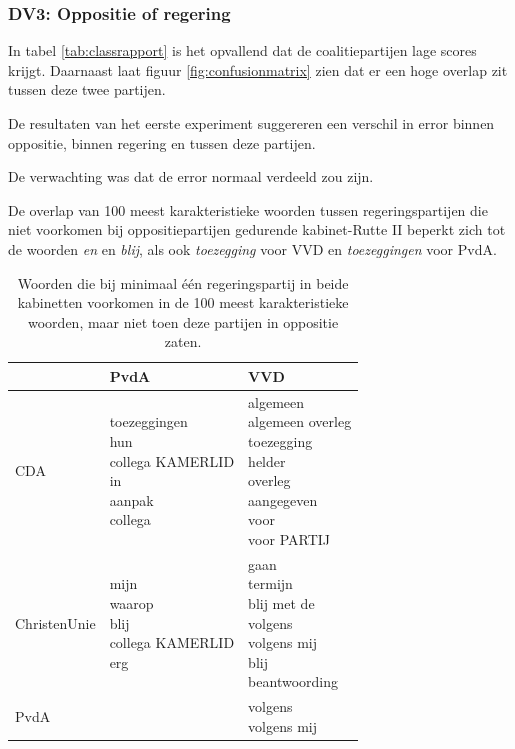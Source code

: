 \subsubsection{DV3: Oppositie of regering}
In tabel \ref{tab:classrapport} is het opvallend dat de coalitiepartijen lage scores krijgt. Daarnaast laat figuur \ref{fig:confusionmatrix} zien dat er een hoge overlap zit tussen deze twee partijen.\par
De resultaten van het eerste experiment suggereren een verschil in error binnen oppositie, binnen regering en tussen deze partijen.\par
De verwachting was dat de error normaal verdeeld zou zijn.\par
De overlap van 100 meest karakteristieke woorden tussen regeringspartijen die niet voorkomen bij oppositiepartijen gedurende kabinet-Rutte II beperkt zich tot de woorden \textit{en} en \textit{blij}, als ook \textit{toezegging} voor VVD en \textit{toezeggingen} voor PvdA.\par
\begin{table}[H]
\label{tab:overlapkabinetten}
\caption{Woorden die bij minimaal één regeringspartij in beide kabinetten voorkomen in de 100 meest karakteristieke woorden, maar niet toen deze partijen in oppositie zaten.}
\centering
\begin{tabular}{|l|l|l|}
\toprule
      &   PvdA &    VVD\\
\midrule
         CDA &    \makecell[l]{toezeggingen\\hun\\collega KAMERLID\\in\\aanpak\\collega} &            \makecell[l]{algemeen\\algemeen overleg\\toezegging\\helder\\overleg\\aangegeven\\voor\\voor PARTIJ} \\ \hline
 ChristenUnie &  \makecell[l]{mijn\\waarop\\blij\\collega KAMERLID\\erg} &        \makecell[l]{gaan\\termijn\\blij met de\\volgens\\volgens mij\\blij\\beantwoording}  \\ \hline
  PvdA &   & \makecell[l]{volgens\\volgens mij}            \\
\bottomrule
\end{tabular}
\end{table}
